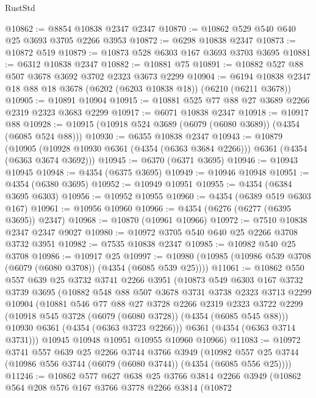 \begin{lexlean}{RustStd}
\begin{coremodule}
@10862 := @8854 @10838 @2347 @2347
@10870 := @10862 @529 @540 @640 @25 @3693 @3705 @2266 @3953
@10872 := @6298 @10838 @2347
@10873 := @10872 @519
@10879 := @10873 @528 @6303 @167 @3693 @3703 @3695
@10881 := @6312 @10838 @2347
@10882 := @10881 @75
@10891 := @10882 @527 @88 @507 @3678 @3692 @3702 @2323 @3673 @2299
@10904 := @6194 @10838 @2347 @18 @88 @18 @3678 (@6202 (@6203 @10838 @18)) (@6210 (@6211 @3678))
@10905 := @10891 @10904
@10915 := @10881 @525 @77 @88 @27 @3689 @2266 @2319 @2323 @3683 @2299
@10917 := @6071 @10838 @2347
@10918 := @10917 @88
@10928 := @10915 (@10918 @524 @3689 (@6079 (@6080 @3689)) (@4354 (@6085 @524 @88)))
@10930 := @6355 @10838 @2347
@10943 := @10879
    (@10905 (@10928 @10930 @6361 (@4354 (@6363 @3684 @2266))) @6361 (@4354 (@6363 @3674 @3692)))
@10945 := @6370 (@6371 @3695)
@10946 := @10943 @10945
@10948 := @4354 (@6375 @3695)
@10949 := @10946 @10948
@10951 := @4354 (@6380 @3695)
@10952 := @10949 @10951
@10955 := @4354 (@6384 @3695 @6303)
@10956 := @10952 @10955
@10960 := @4354 (@6389 @519 @6303 @167)
@10961 := @10956 @10960
@10966 := @4354 (@6276 (@6277 (@6395 @3695)) @2347)
@10968 := @10870 (@10961 @10966)
@10972 := @7510 @10838 @2347 @2347 @9027
@10980 := @10972 @3705 @540 @640 @25 @2266 @3708 @3732 @3951
@10982 := @7535 @10838 @2347
@10985 := @10982 @540 @25 @3708
@10986 := @10917 @25
@10997 := @10980 (@10985 (@10986 @539 @3708 (@6079 (@6080 @3708)) (@4354 (@6085 @539 @25))))
@11061 := @10862
    @550
    @557
    @639
    @25
    @3732
    @3741
    @2266
    @3951
    (@10873
      @549
      @6303
      @167
      @3732
      @3739
      @3695
      (@10882
        @548
        @88
        @507
        @3678
        @3731
        @3738
        @2323
        @3713
        @2299
        @10904
        (@10881
          @546
          @77
          @88
          @27
          @3728
          @2266
          @2319
          @2323
          @3722
          @2299
          (@10918 @545 @3728 (@6079 (@6080 @3728)) (@4354 (@6085 @545 @88)))
          @10930
          @6361
          (@4354 (@6363 @3723 @2266)))
        @6361
        (@4354 (@6363 @3714 @3731)))
      @10945
      @10948
      @10951
      @10955
      @10960
      @10966)
@11083 := @10972
    @3741
    @557
    @639
    @25
    @2266
    @3744
    @3766
    @3949
    (@10982 @557 @25 @3744 (@10986 @556 @3744 (@6079 (@6080 @3744)) (@4354 (@6085 @556 @25))))
@11246 := @10862
    @577
    @627
    @638
    @25
    @3766
    @3814
    @2266
    @3949
    (@10862
      @564
      @208
      @576
      @167
      @3766
      @3778
      @2266
      @3814
      (@10872

\end{coremodule}
\end{lexlean}
